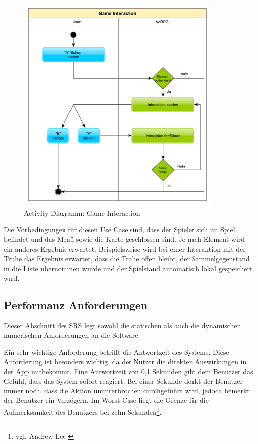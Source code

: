 			\begin{figure}[htbp]
				\centering 
				\label{umlInteraction}
				\includegraphics[width=10cm]{pics/GameInteraction.pdf}
				\caption{Activity Diagramm: Game Interaction}
			\end{figure}
			
			Die Vorbedingungen für diesen Use Case sind, dass der Spieler sich im Spiel befindet und das Menü sowie die Karte geschlossen sind. Je nach Element wird ein anderes Ergebnis erwartet. Beispielsweise wird bei einer Interaktion mit der Truhe das Ergebnis erwartet, dass die Truhe offen bleibt, der Sammelgegenstand in die Liste übernommen wurde und der Spielstand automatisch lokal gespeichert wird.
	
	\pagebreak
	\subsection{Performanz Anforderungen}
		Dieser Abschnitt des \ac{SRS} legt sowohl die statischen als auch die dynamischen numerischen Anforderungen an die Software. 
	
		Ein sehr wichtige Anforderung betrifft die Antwortzeit des Systems. Diese Anforderung ist besonders wichtig, da der Nutzer die direkten Auswirkungen in der App mitbekommt. Eine Antwortzeit von 0,1 Sekunden gibt dem Benutzer das Gefühl, dass das System sofort reagiert. Bei einer Sekunde denkt der Benutzer immer noch, dass die Aktion ununterbrochen durchgeführt wird, jedoch bemerkt der Benutzer ein Verzögern. Im Worst Case liegt die Grenze für die Aufmerksamkeit des Benutzers bei zehn Sekunden\footnote{vgl. Andrew Lee \cite{performance1}}.
		
